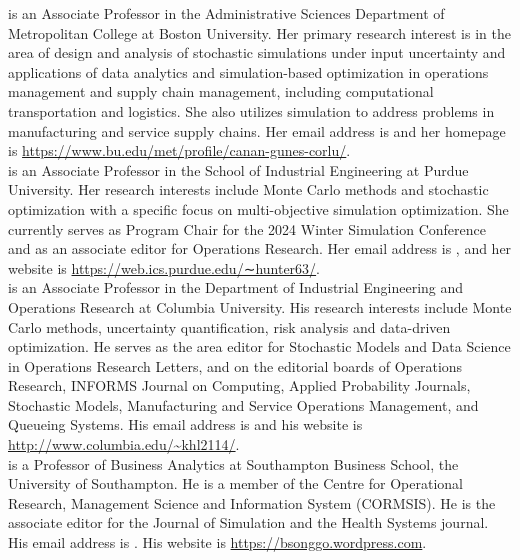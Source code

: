 \documentclass{wscpaperproc}
\theoremstyle{wsc}
\begin{document}
  is an Associate Professor in the Administrative Sciences Department of Metropolitan College at Boston University. Her primary research interest is in the area of design and analysis of stochastic simulations under input uncertainty and applications of data analytics and simulation-based optimization in operations management and supply chain management, including computational transportation and logistics. She also utilizes simulation to address problems in manufacturing and service supply chains. Her email address is  and her homepage is \url{https://www.bu.edu/met/profile/canan-gunes-corlu/}.\\

 is an Associate Professor in the School of Industrial Engineering at Purdue University. Her research
interests include Monte Carlo methods and stochastic optimization with a specific focus on multi-objective simulation optimization. She currently serves as Program Chair for the 2024 Winter Simulation Conference and as an associate editor
for Operations Research. Her email address is , and her website is \url{https://web.ics.purdue.edu/∼hunter63/}.\\

 is an Associate Professor in the Department of Industrial Engineering and Operations Research at Columbia University. His research interests include Monte Carlo methods, uncertainty quantification, risk analysis and data-driven optimization. He serves as the area editor for Stochastic Models and Data Science in Operations Research Letters, and on the editorial boards of Operations Research, INFORMS Journal on Computing, Applied Probability Journals, Stochastic Models, Manufacturing and Service Operations Management, and Queueing Systems. His email address is  and his website is \url{http://www.columbia.edu/~khl2114/}.\\

 is a Professor of Business Analytics at Southampton Business School, the University of Southampton. He is a member of the Centre for Operational Research, Management Science and Information System (CORMSIS). He is the associate editor for the Journal of Simulation and the Health Systems journal. His email address is . His website is \url{https://bsonggo.wordpress.com}.
\end{document}
